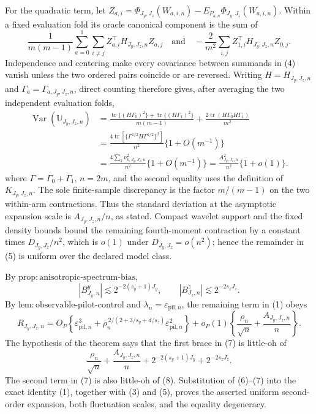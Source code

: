 For the quadratic term, let \(Z_{a,i}=\Phi_{J_y,J_z}(W_{a,i,n})-E_{P_{a,n}}\Phi_{J_y,J_z}(W_{a,i,n})\).  Within a fixed evaluation fold its oracle canonical component is the sum of
\[
\frac{1}{m(m-1)}\sum_{a=0}^1\sum_{i\ne j}Z_{a,i}^{\top}H_{J_y,J_z,n}Z_{a,j}
\quad\text{and}\quad
-\frac{2}{m^2}\sum_{i,j}Z_{1,i}^{\top}H_{J_y,J_z,n}Z_{0,j}.              \tag{4}
\]
Independence and centering make every covariance between summands in (4) vanish unless the two ordered pairs coincide or are reversed.  Writing \(H=H_{J_y,J_z,n}\) and \(\Gamma_a=\Gamma_{a,J_y,J_z,n}\), direct counting therefore gives, after averaging the two independent evaluation folds,
\[
\begin{aligned}
\operatorname{Var}(\mathbb U_{J_y,J_z,n})
&=\frac{\operatorname{tr}\{(H\Gamma_0)^2\}+\operatorname{tr}\{(H\Gamma_1)^2\}}{m(m-1)}
+\frac{2\operatorname{tr}(H\Gamma_0H\Gamma_1)}{m^2}\\
&=\frac{4\operatorname{tr}\!\left[\{\Gamma^{1/2}H\Gamma^{1/2}\}^2\right]}{n^2}\{1+O(m^{-1})\}\\
&=\frac{4\sum_k\nu_{k,J_y,J_z,n}^2}{n^2}\{1+O(m^{-1})\}
=\frac{A_{J_y,J_z,n}^2}{n^2}\{1+o(1)\}.
\end{aligned}                                                            \tag{5}
\]
where \(\Gamma=\Gamma_0+\Gamma_1\), \(n=2m\), and the second equality uses the definition of \(K_{J_y,J_z,n}\).  The sole finite-sample discrepancy is the factor \(m/(m-1)\) on the two within-arm contractions.  Thus the standard deviation at the asymptotic expansion scale is \(A_{J_y,J_z,n}/n\), as stated.  Compact wavelet support and the fixed density bounds bound the remaining fourth-moment contraction by a constant times \(D_{J_y,J_z}/n^2\), which is \(o(1)\) under \(D_{J_y,J_z}=o(n^2)\); hence the remainder in (5) is uniform over the declared model class.

By \(\mathrm{prop{:}anisotropic\text{-}spectrum\text{-}bias}\),
\[
|B^y_{J_y,n}|\lesssim2^{-2(s_y+1)J_y},\qquad
|B^z_{J_z,n}|\lesssim2^{-2s_zJ_z}.                                      \tag{6}
\]
By \(\mathrm{lem{:}observable\text{-}pilot\text{-}control}\) and \(\lambda_n=\varepsilon_{\mathrm{pil},n}\), the remaining term in (1) obeys
\[
R_{J_y,J_z,n}
=O_P\!\left\{\varepsilon_{\mathrm{pil},n}^3
+\rho_n^{\,2/(2+3/s_y+d/s_z)}\varepsilon_{\mathrm{pil},n}^2\right\}
+o_P(1)\left\{\frac{\rho_n}{\sqrt n}+\frac{A_{J_y,J_z,n}}n\right\}.    \tag{7}
\]
The hypothesis of the theorem says that the first brace in (7) is little-oh of
\[
\frac{\rho_n}{\sqrt n}+\frac{A_{J_y,J_z,n}}n
+2^{-2(s_y+1)J_y}+2^{-2s_zJ_z}.                                         \tag{8}
\]
The second term in (7) is also little-oh of (8).  Substitution of (6)--(7) into the exact identity (1), together with (3) and (5), proves the asserted uniform second-order expansion, both fluctuation scales, and the equality degeneracy.

